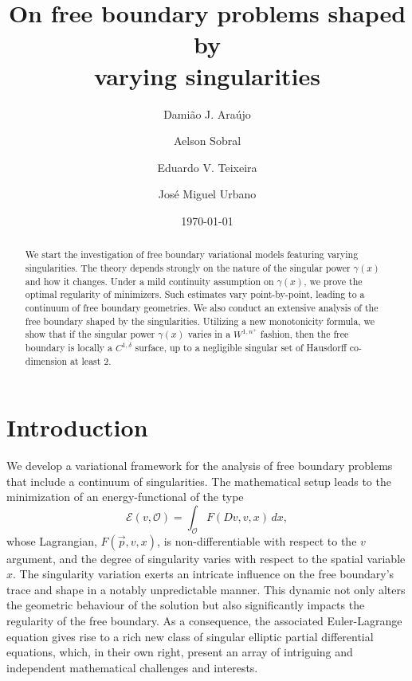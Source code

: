 \documentclass[reqno,11pt]{amsart}
\title[On FBP shaped by varying singularities]{On free boundary problems shaped by\\ varying singularities}
\author[D.J. Ara\'ujo]{Dami\~ao J. Ara\'ujo}
\author[A. Sobral]{Aelson Sobral}
\author[E. V. Teixeira]{Eduardo V. Teixeira}
\author[J.M.~Urbano]{Jos\'{e} Miguel Urbano}
\newcommand{\1}{\mathds{1}}
\numberwithin{equation}{section}
\begin{document}


\begin{abstract} 
We start the investigation of free boundary variational models featuring varying singularities. The theory depends strongly on the nature of the singular power $\gamma(x)$ and how it changes. Under a mild continuity assumption on $\gamma(x)$, we prove the optimal regularity of minimizers. Such estimates vary point-by-point, leading to a continuum of free boundary geometries. We also conduct an extensive analysis of the free boundary shaped by the singularities.  Utilizing a new monotonicity formula, we show that if the singular power $\gamma(x)$ varies in a $W^{1,n^{+}}$ fashion, then the free boundary is locally a $C^{1,\delta}$ surface, up to a negligible singular set of Hausdorff co-dimension at least $2$.
\end{abstract}  

\date{\today}

\maketitle

\tableofcontents

\section{Introduction} \label{sct intro}

We develop a variational framework for the analysis of free boundary problems that include a continuum of singularities. The mathematical setup leads to the minimization of an energy-functional of the type
\begin{equation}\label{general F intro}  
    \mathscr{E}(v, \mathcal{O}) = \int_{\mathcal{O}} {F}(Dv, v, x) \, dx,
\end{equation}
whose Lagrangian, $F(\vec{p}, v, x)$, is non-differentiable with respect to the $v$ argument, and the degree of singularity varies with respect to the spatial variable $x$. The singularity variation exerts an intricate influence on the free boundary's trace and shape in a notably unpredictable manner. This dynamic not only alters the geometric behaviour of the solution but also significantly impacts the regularity of the free boundary. As a consequence, the associated Euler-Lagrange equation gives rise to a rich new class of singular elliptic partial differential equations, which, in their own right, present an array of intriguing and independent mathematical challenges and interests.
\end{document}
